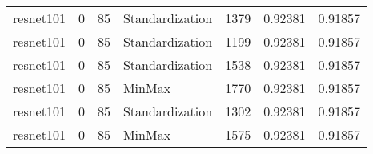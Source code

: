 \begin{tabular}{lrrlrrr}
 resnet101          &             0 &            85 & Standardization &       1379 &          0.92381 &    0.91857 \\
 resnet101          &             0 &            85 & Standardization &       1199 &          0.92381 &    0.91857 \\
 resnet101          &             0 &            85 & Standardization &       1538 &          0.92381 &    0.91857 \\
 resnet101          &             0 &            85 & MinMax          &       1770 &          0.92381 &    0.91857 \\
 resnet101          &             0 &            85 & Standardization &       1302 &          0.92381 &    0.91857 \\
 resnet101          &             0 &            85 & MinMax          &       1575 &          0.92381 &    0.91857 \\
\hline
\end{tabular}